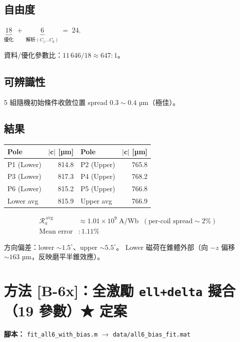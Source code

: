 \documentclass[11pt,a4paper]{article}
\newcommand{\Ra}{\mathcal{R}_a}
\newcommand{\cvec}{\mathbf{c}}
\begin{document}
\subsection{自由度}
\(\underbrace{18}_{\text{優化}} \;+\; \underbrace{6}_{\text{解析} (C_1 \dots C_6)} \;=\; 24.\)

資料/優化參數比：\(11\,646 / 18 \approx 647:1\)。

\subsection{可辨識性}

5 組隨機初始條件收斂位置 spread \(0.3 \sim 0.4\) µm（極佳）。

\subsection{結果}

\begin{center}
\begin{tabular}{lrlr}
\toprule
Pole & \(|\cvec|\) [µm] & Pole & \(|\cvec|\) [µm] \\
\midrule
P1 (Lower) & 814.8 & P2 (Upper) & 765.8 \\
P3 (Lower) & 817.3 & P4 (Upper) & 768.2 \\
P6 (Lower) & 815.2 & P5 (Upper) & 766.8 \\
\midrule
Lower avg  & 815.9 & Upper avg  & 766.9 \\
\bottomrule
\end{tabular}
\end{center}

\begin{align*}
\Ra^{\,\text{avg}} &\approx 1.01 \times 10^{9} \;\text{A/Wb}\;\; (\text{per-coil spread} \sim 2\%) \\
\text{Mean error}  &: 1.11\%
\end{align*}

方向偏差：lower \(\sim 1.5^\circ\)、upper \(\sim 5.5^\circ\)。
Lower 磁荷在錐體外部（向 \(-z\) 偏移 \(\sim 163\) µm，反映磨平半錐效應）。

\section{方法 [B-6x]：全激勵 \texttt{ell+delta} 擬合（19 參數）★ 定案}

\textbf{腳本：} \texttt{fit\_all6\_with\_bias.m} \(\rightarrow\) \texttt{data/all6\_bias\_fit.mat}
\end{document}
